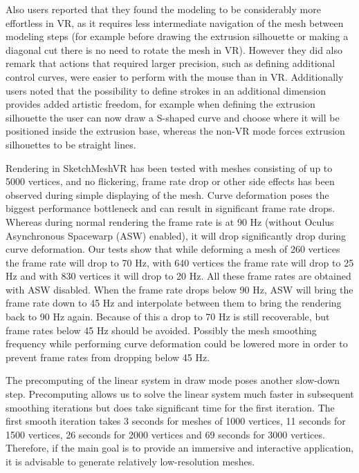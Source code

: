 Also users reported that they found the modeling to be considerably more effortless in VR, as it requires less intermediate navigation of the mesh between modeling steps (for example before drawing the extrusion silhouette or making a diagonal cut there is no need to rotate the mesh in VR). However they did also remark that actions that required larger precision, such as defining additional control curves, were easier to perform with the mouse than in VR.
Additionally users noted that the possibility to define strokes in an additional dimension provides added artistic freedom, for example when defining the extrusion silhouette the user can now draw a S-shaped curve and choose where it will be positioned inside the extrusion base, whereas the non-VR mode forces extrusion silhouettes to be straight lines. 

Rendering in SketchMeshVR has been tested with meshes consisting of up to 5000 vertices, and no flickering, frame rate drop or other side effects has been observed during simple displaying of the mesh. Curve deformation poses the biggest performance bottleneck and can result in significant frame rate drops. Whereas during normal rendering the frame rate is at 90 Hz (without Oculus Asynchronous Spacewarp (ASW) enabled), it will drop significantly drop during curve deformation. Our tests show that while deforming a mesh of 260 vertices the frame rate will drop to 70 Hz, with 640 vertices the frame rate will drop to 25 Hz and with 830 vertices it will drop to 20 Hz. All these frame rates are obtained with ASW disabled. When the frame rate drops below 90 Hz, ASW will bring the frame rate down to 45 Hz and interpolate between them to bring the rendering back to 90 Hz again. Because of this a drop to 70 Hz is still recoverable, but frame rates below 45 Hz should be avoided. Possibly the mesh smoothing frequency while performing curve deformation could be lowered more in order to prevent frame rates from dropping below 45 Hz.

The precomputing of the linear system in draw mode poses another slow-down step. Precomputing allows us to solve the linear system much faster in subsequent smoothing iterations but does take significant time for the first iteration. The first smooth iteration takes 3 seconds for meshes of 1000 vertices, 11 seconds for 1500 vertices, 26 seconds for 2000 vertices and 69 seconds for 3000 vertices. Therefore, if the main goal is to provide an immersive and interactive application, it is advisable to generate relatively low-resolution meshes.